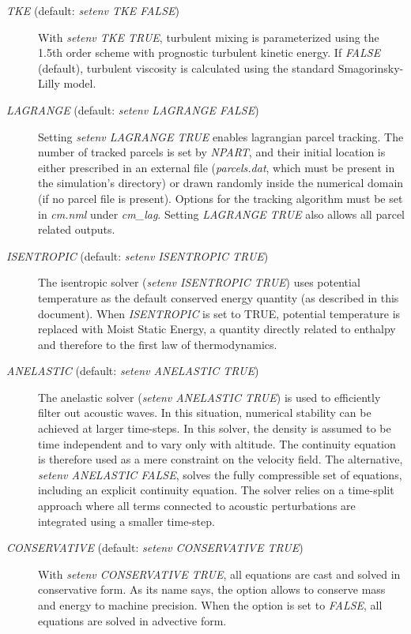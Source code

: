 \documentclass[12pt,A4,french]{article}
\begin{document}
\begin{description}
\item[{\it TKE} (default: {\it setenv TKE FALSE})]

With {\it setenv TKE TRUE}, turbulent mixing is parameterized using the 1.5th order scheme with prognostic turbulent kinetic energy. If {\it FALSE} (default), turbulent viscosity is calculated using the standard Smagorinsky-Lilly model.

\item[{\it LAGRANGE} (default: {\it setenv LAGRANGE FALSE})]

Setting {\it setenv LAGRANGE TRUE} enables lagrangian parcel tracking. The number of tracked parcels is set by {\it NPART}, and their initial location is either prescribed in an external file ({\it parcels.dat}, which must be present in the simulation's directory) or drawn randomly inside the numerical domain (if no parcel file is present). Options for the tracking algorithm must be set in {\it cm.nml} under {\it cm\_lag}. Setting {\it LAGRANGE TRUE} also allows all parcel related outputs.

\item[{\it ISENTROPIC} (default: {\it setenv ISENTROPIC TRUE})]

The isentropic solver ({\it setenv ISENTROPIC TRUE}) uses potential temperature as the default conserved energy quantity (as described in this document). When {\it ISENTROPIC} is set to TRUE, potential temperature is replaced with Moist Static Energy, a quantity directly related to enthalpy and therefore to the first law of thermodynamics.

\item[{\it ANELASTIC} (default: {\it setenv ANELASTIC TRUE})]

The anelastic solver ({\it setenv ANELASTIC TRUE}) is used to efficiently filter out acoustic waves. In this situation, numerical stability can be achieved at larger time-steps. In this solver, the density is assumed to be time independent and to vary only with altitude. The continuity equation is therefore used as a mere constraint on the velocity field. The alternative, {\it setenv ANELASTIC FALSE}, solves the fully compressible set of equations, including an explicit continuity equation. The solver relies on a time-split approach where all terms connected to acoustic perturbations are integrated using a smaller time-step.

\item[{\it CONSERVATIVE} (default: {\it setenv CONSERVATIVE TRUE})]

With {\it setenv CONSERVATIVE TRUE}, all equations are cast and solved in conservative form. As its name says, the option allows to conserve mass and energy to machine precision. When the option is set to {\it FALSE}, all equations are solved in advective form. 


\end{description}
\end{document}
